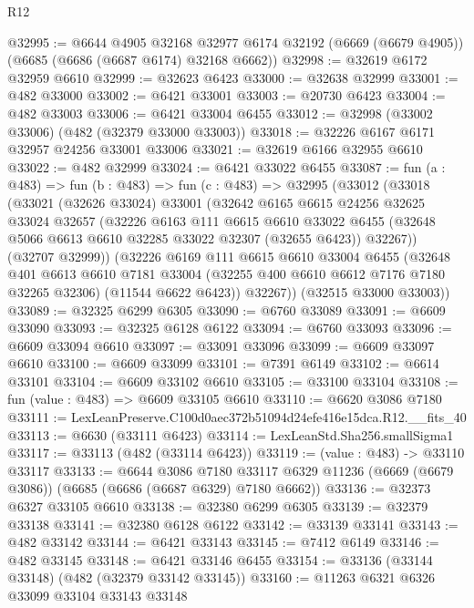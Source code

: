 \begin{lexlean}{R12}
\begin{coremodule}
@32995 := @6644
    @4905
    @32168
    @32977
    @6174
    @32192
    (@6669 (@6679 @4905))
    (@6685 (@6686 (@6687 @6174) @32168 @6662))
@32998 := @32619 @6172 @32959 @6610
@32999 := @32623 @6423
@33000 := @32638 @32999
@33001 := @482 @33000
@33002 := @6421 @33001
@33003 := @20730 @6423
@33004 := @482 @33003
@33006 := @6421 @33004 @6455
@33012 := @32998 (@33002 @33006) (@482 (@32379 @33000 @33003))
@33018 := @32226 @6167 @6171 @32957 @24256 @33001 @33006
@33021 := @32619 @6166 @32955 @6610
@33022 := @482 @32999
@33024 := @6421 @33022 @6455
@33087 := fun (a : @483) =>
  fun (b : @483) =>
  fun (c : @483) =>
  @32995
    (@33012
      (@33018
        (@33021
          (@32626 @33024)
          @33001
          (@32642
            @6165
            @6615
            @24256
            @32625
            @33024
            @32657
            (@32226
              @6163
              @111
              @6615
              @6610
              @33022
              @6455
              (@32648 @5066 @6613 @6610 @32285 @33022 @32307 (@32655 @6423))
              @32267))
          (@32707 @32999))
        (@32226
          @6169
          @111
          @6615
          @6610
          @33004
          @6455
          (@32648
            @401
            @6613
            @6610
            @7181
            @33004
            (@32255 @400 @6610 @6612 @7176 @7180 @32265 @32306)
            (@11544 @6622 @6423))
          @32267))
      (@32515 @33000 @33003))
@33089 := @32325 @6299 @6305
@33090 := @6760 @33089
@33091 := @6609 @33090
@33093 := @32325 @6128 @6122
@33094 := @6760 @33093
@33096 := @6609 @33094 @6610
@33097 := @33091 @33096
@33099 := @6609 @33097 @6610
@33100 := @6609 @33099
@33101 := @7391 @6149
@33102 := @6614 @33101
@33104 := @6609 @33102 @6610
@33105 := @33100 @33104
@33108 := fun (value : @483) => @6609 @33105 @6610
@33110 := @6620 @3086 @7180
@33111 := LexLeanPreserve.C100d0aec372b51094d24efe416e15dca.R12.__fits_40
@33113 := @6630 (@33111 @6423)
@33114 := LexLeanStd.Sha256.smallSigma1
@33117 := @33113 (@482 (@33114 @6423))
@33119 := (value : @483) -> @33110 @33117
@33133 := @6644
    @3086
    @7180
    @33117
    @6329
    @11236
    (@6669 (@6679 @3086))
    (@6685 (@6686 (@6687 @6329) @7180 @6662))
@33136 := @32373 @6327 @33105 @6610
@33138 := @32380 @6299 @6305
@33139 := @32379 @33138
@33141 := @32380 @6128 @6122
@33142 := @33139 @33141
@33143 := @482 @33142
@33144 := @6421 @33143
@33145 := @7412 @6149
@33146 := @482 @33145
@33148 := @6421 @33146 @6455
@33154 := @33136 (@33144 @33148) (@482 (@32379 @33142 @33145))
@33160 := @11263 @6321 @6326 @33099 @33104 @33143 @33148

\end{coremodule}
\end{lexlean}

